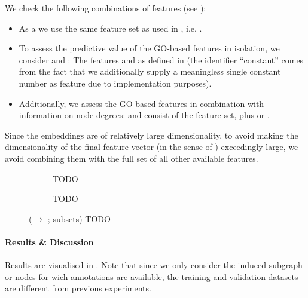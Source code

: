 \documentclass[
	fontsize=10pt, %
	twoside=false, %
	secnumdepth=1, %
  toc=indentunnumbered %
]{kaobook}
\begin{document}
We check the following combinations of features (see ):
\begin{itemize}
\item As a  we use the same feature set as used in
  , i.e. .
\item To assess the predictive value of the GO-based features in isolation, we consider
   and : The features
   and  as defined in
   (the identifier ``constant'' comes from the fact
  that we additionally supply a meaningless single constant number as feature
  due to implementation purposes).
\item Additionally, we assess the GO-based features in combination with
  information on node degrees:  and  consist
  of the  feature set, plus  or .
\end{itemize}
Since the embeddings are of relatively large dimensionality, to avoid making the
dimensionality of the final feature vector (in the sense of
) exceedingly large, we avoid combining them with the
full set of all other available features.


\begin{figure}[h]
  \centering
  \begin{subfigure}{0.48\linewidth}
    \caption{TODO}
  \end{subfigure}
  \begin{subfigure}{0.48\linewidth}
    \caption{TODO}
  \end{subfigure}
  \caption{(\ADLast $\rightarrow$ \PDMap{}; subsets) TODO}
  \label{fig:annotations-results}
\end{figure}

\paragraph{Results \& Discussion} Results are visualised in
. Note that since we only consider the induced
subgraph or nodes for wich annotations are available, the training and
validation datasets are different from previous experiments.
\end{document}
